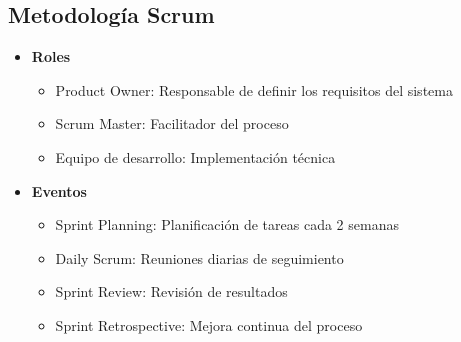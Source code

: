 \documentclass[conference]{IEEEtran}
\begin{document}
\subsection{Metodología Scrum}
\begin{itemize}
    \item \textbf{Roles}
    \begin{itemize}
        \item Product Owner: Responsable de definir los requisitos del sistema
        \item Scrum Master: Facilitador del proceso
        \item Equipo de desarrollo: Implementación técnica
    \end{itemize}
    
    \item \textbf{Eventos}
    \begin{itemize}
        \item Sprint Planning: Planificación de tareas cada 2 semanas
        \item Daily Scrum: Reuniones diarias de seguimiento
        \item Sprint Review: Revisión de resultados
        \item Sprint Retrospective: Mejora continua del proceso
    \end{itemize}
\end{itemize}
\end{document}
